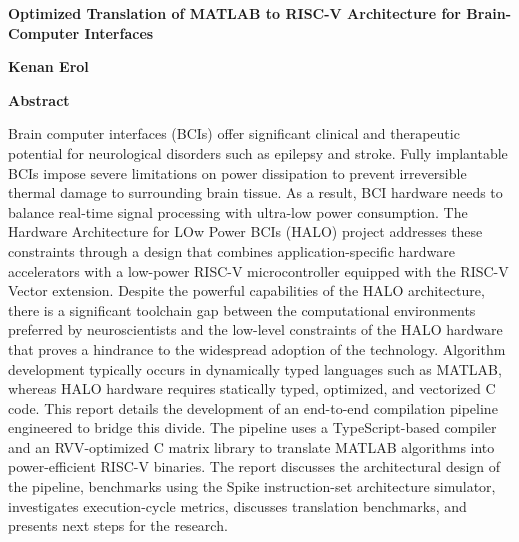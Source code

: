 \thispagestyle{plain}
\begin{center}
    \Large
    \textbf{Optimized Translation of MATLAB to RISC-V Architecture for Brain-Computer Interfaces}
    
    \vspace{0.4cm}
    \large
    
    \vspace{0.4cm}
    \textbf{Kenan Erol}
    
    \vspace{0.9cm}
    \textbf{Abstract}
\end{center}


Brain computer interfaces (BCIs) offer significant clinical and therapeutic potential for neurological disorders such as epilepsy and stroke. Fully implantable BCIs impose severe limitations on power dissipation to prevent irreversible thermal damage to surrounding brain tissue. As a result, BCI hardware needs to balance real-time signal processing with ultra-low power consumption. The Hardware Architecture for LOw Power BCIs (HALO) project addresses these constraints through a design that combines application-specific hardware accelerators with a low-power RISC-V microcontroller equipped with the RISC-V Vector extension. Despite the powerful capabilities of the HALO architecture, there is a significant toolchain gap between the computational environments preferred by neuroscientists and the low-level constraints of the HALO hardware that proves a hindrance to the widespread adoption of the technology. Algorithm development typically occurs in dynamically typed languages such as MATLAB, whereas HALO hardware requires statically typed, optimized, and vectorized C code. This report details the development of an end-to-end compilation pipeline engineered to bridge this divide. The pipeline uses a TypeScript-based compiler and an RVV-optimized C matrix library to translate MATLAB algorithms into power-efficient RISC-V binaries. The report discusses the architectural design of the pipeline, benchmarks using the Spike instruction-set architecture simulator, investigates execution-cycle metrics, discusses translation benchmarks, and presents next steps for the research.



